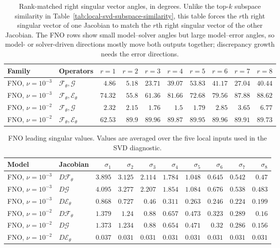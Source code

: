 ﻿\documentclass[letterpaper]{article} %
\newcommand{\tabref}[1]{Table~\ref{#1}}
\begin{document}
\begin{table}[H]
\centering
\footnotesize
\caption{Rank-matched right singular vector angles, in degrees. Unlike the
top-$k$ subspace similarity in \tabref{tab:local-svd-subspace-similarity}, this
table forces the $r$th right singular vector of one Jacobian to match the $r$th
right singular vector of the other Jacobian. The FNO rows show small
model--solver angles but large model--error angles, so model- or solver-driven
directions mostly move both outputs together; discrepancy growth needs the
error directions.}
\label{tab:local-svd-rank-angles}
\setlength{\tabcolsep}{3pt}
\begin{tabular}{llrrrrrrrr}
\toprule
Family & Operators & $r=1$ & $r=2$ & $r=3$ & $r=4$ & $r=5$ & $r=6$ & $r=7$ & $r=8$ \\
\midrule
FNO, $\nu=10^{-3}$ & $\mathcal{F}_\theta,\mathcal{G}$ & $4.86$ & $5.18$ & $23.71$ & $39.07$ & $53.83$ & $41.17$ & $27.04$ & $40.44$ \\
FNO, $\nu=10^{-3}$ & $\mathcal{F}_\theta,\mathcal{E}_\theta$ & $74.32$ & $55.8$ & $61.36$ & $81.66$ & $72.68$ & $79.56$ & $87.88$ & $88.62$ \\
FNO, $\nu=10^{-2}$ & $\mathcal{F}_\theta,\mathcal{G}$ & $2.32$ & $2.15$ & $1.76$ & $1.5$ & $1.79$ & $2.85$ & $3.65$ & $6.77$ \\
FNO, $\nu=10^{-2}$ & $\mathcal{F}_\theta,\mathcal{E}_\theta$ & $62.53$ & $89.9$ & $89.96$ & $89.87$ & $89.95$ & $89.96$ & $89.91$ & $89.73$ \\
\bottomrule
\end{tabular}
\end{table}

\begin{table}[H]
\centering
\footnotesize
\caption{FNO leading singular values. Values are averaged over the five local
inputs used in the SVD diagnostic.}
\label{tab:local-svd-singular-values}
\setlength{\tabcolsep}{3pt}
\begin{tabular*}{\textwidth}{@{\extracolsep{\fill}}llrrrrrrrr@{}}
\toprule
Model & Jacobian & $\sigma_1$ & $\sigma_2$ & $\sigma_3$ & $\sigma_4$ & $\sigma_5$ & $\sigma_6$ & $\sigma_7$ & $\sigma_8$ \\
\midrule
FNO, $\nu=10^{-3}$ & $D\mathcal{F}_\theta$ & $3.895$ & $3.125$ & $2.114$ & $1.784$ & $1.048$ & $0.645$ & $0.542$ & $0.47$ \\
FNO, $\nu=10^{-3}$ & $D\mathcal{G}$ & $4.095$ & $3.277$ & $2.207$ & $1.854$ & $1.084$ & $0.676$ & $0.538$ & $0.483$ \\
FNO, $\nu=10^{-3}$ & $D\mathcal{E}_\theta$ & $0.868$ & $0.727$ & $0.46$ & $0.311$ & $0.263$ & $0.246$ & $0.224$ & $0.199$ \\
FNO, $\nu=10^{-2}$ & $D\mathcal{F}_\theta$ & $1.379$ & $1.24$ & $0.88$ & $0.657$ & $0.473$ & $0.323$ & $0.289$ & $0.16$ \\
FNO, $\nu=10^{-2}$ & $D\mathcal{G}$ & $1.373$ & $1.234$ & $0.88$ & $0.654$ & $0.471$ & $0.32$ & $0.286$ & $0.156$ \\
FNO, $\nu=10^{-2}$ & $D\mathcal{E}_\theta$ & $0.037$ & $0.031$ & $0.031$ & $0.031$ & $0.031$ & $0.031$ & $0.031$ & $0.031$ \\
\bottomrule
\end{tabular*}
\end{table}
\end{document}
